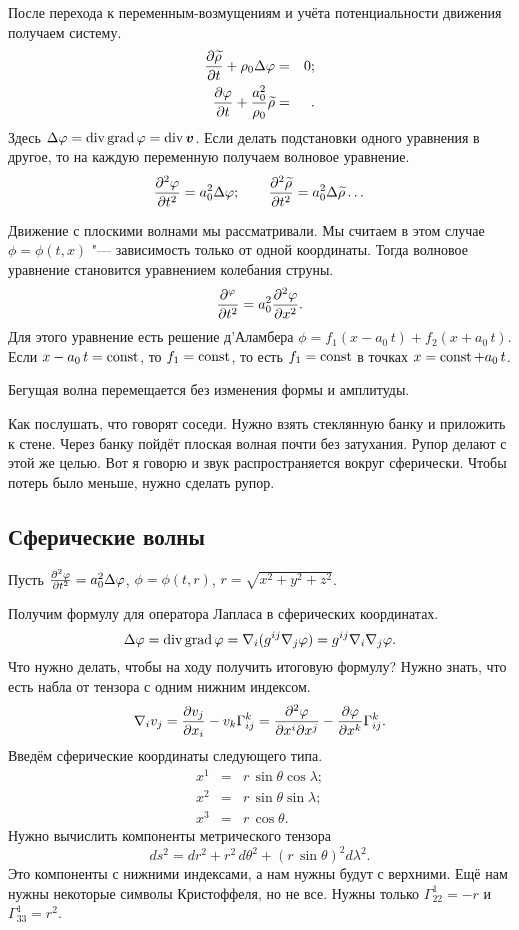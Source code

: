 После перехода к переменным-возмущениям и учёта потенциальности движения получаем систему.
\begin{eqnarray*}
  \frac{\partial \widetilde{\rho}{}}{\partial t} + \rho_0\Delta\varphi &=&0;\\
  \frac{\partial \varphi}{\partial t} + \frac{a_0^2}{\rho_0}\widetilde{\rho}{}&=&.
\end{eqnarray*}
Здесь $\Delta\varphi = \operatorname{div}\operatorname{grad}\varphi = \operatorname{div}\boldsymbol{v}$. Если делать подстановки одного уравнения в другое, то на каждую переменную получаем волновое уравнение.
\begin{equation*}
  \frac{\partial ^2\varphi}{\partial t^2} = a^2_0\Delta\varphi;\qquad \frac{\partial ^2\widetilde{\rho}{}}{\partial t^2} = a_0^2\Delta\widetilde{\rho}{}\dots
\end{equation*}

Движение с плоскими волнами мы рассматривали. Мы считаем в этом случае $\phi = \phi(t,x)$ "--- зависимость только от одной координаты. Тогда волновое уравнение становится уравнением колебания струны.
\[
  \frac{\partial ^\varphi}{\partial t^2} = a_0^2\frac{\partial ^2\varphi}{\partial x^2}.
\]
Для этого уравнение есть решение д'Аламбера $\phi = f_1(x-a_0\,t) + f_2(x+a_0\,t)$. Если $x - a_0\,t = \operatorname{const}$, то $f_1=\operatorname{const}$, то есть $f_1=\operatorname{const}$ в точках $x = \operatorname{const} + a_0\,t$.


Бегущая волна перемещается без изменения формы и амплитуды.

Как послушать, что говорят соседи. Нужно взять стеклянную банку и приложить к стене. Через банку пойдёт плоская волная почти без затухания. Рупор делают с этой же целью. Вот я говорю и звук распространяется вокруг сферически. Чтобы потерь было меньше, нужно сделать рупор.

\subsection{Сферические волны}
Пусть $\frac{\partial ^2\varphi}{\partial t^2} = a_0^2\Delta\varphi$, $\phi = \phi(t,r)$, $r = \sqrt{x^2+y^2+z^2}$.

Получим формулу для оператора Лапласа в сферических координатах.
\[
  \Delta\varphi = \operatorname{div}\operatorname{grad}\varphi = \nabla_i(g^{ij}\nabla_j\varphi) = g^{ij}\nabla_i\nabla_j\varphi.
\]
Что нужно делать, чтобы на ходу получить итоговую формулу? Нужно знать, что есть набла от тензора с одним нижним индексом.
\[
  \nabla_i v_j = \frac{\partial v_j}{\partial x_i} - v_k\Gamma_{ij}^k = \frac{\partial ^2\varphi}{\partial x^i\partial x^j} - \frac{\partial \varphi}{\partial x^k}\Gamma_{ij}^k.
\]
Введём сферические координаты следующего типа.
\begin{eqnarray*}
  x^1 &=& r\,\sin\theta\cos\lambda;\\
  x^2 &=& r\,\sin\theta\sin\lambda;\\
  x^3 &=& r\,\cos\theta.
\end{eqnarray*}
Нужно вычислить компоненты метрического тензора
\[
  ds^2 = dr^2 + r^2\,d\theta^2 + (r\,\sin\theta)^2d\lambda^2.
\]
Это компоненты с нижними индексами, а нам нужны будут с верхними. Ещё нам нужны некоторые символы Кристоффеля, но не все. Нужны только $\Gamma^1_{22} = -r$ и $\Gamma_{33}^1 = r^2$.

